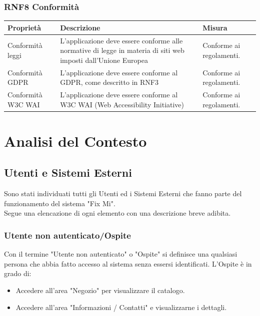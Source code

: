 \documentclass{report}
\begin{document}
\subsection*{RNF8 Conformità}
\begin{center} %
	\centering
	\begin{tabular}{ |p{3cm}|p{4cm}|p{4cm}|  }
		\hline
		\centering Proprietà & \qquad\quad Descrizione & \qquad\qquad Misura\\ %
		\hline
		Conformità leggi & L'applicazione deve essere conforme alle normative di legge in materia di siti web imposti dall'Unione Europea & Conforme ai regolamenti. \\
		\hline
		Conformità GDPR & L'applicazione deve essere conforme al GDPR, come descritto in RNF3 & Conforme ai regolamenti.\\
		\hline
		Conformità W3C WAI & L'applicazione deve essere conforme al W3C WAI (Web Accessibility Initiative) & Conforme ai regolamenti.\\ 
		\hline
	\end{tabular}

\end{center}


\chapter{Analisi del Contesto}

\section{Utenti e Sistemi Esterni}

Sono stati individuati tutti gli Utenti ed i Sistemi Esterni che fanno parte del funzionamento del sistema "Fix Mi".\\Segue una elencazione di ogni elemento con una descrizione breve adibita.


\subsection*{Utente non autenticato/Ospite}
Con il termine "Utente non autenticato" o "Ospite" si definisce una qualsiasi persona che abbia fatto accesso al sistema senza essersi identificati. L'Ospite è in grado di:
\begin{itemize}
	\item Accedere all'area "Negozio" per visualizzare il catalogo.
	\item Accedere all'area "Informazioni / Contatti" e visualizzarne i dettagli. 
\end{itemize}
\end{document}
